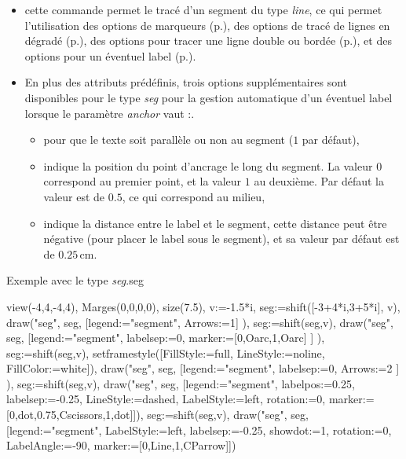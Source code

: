 {\centering {}\par}

\begin{itemize}
 \item\desc cette commande permet le tracé d'un segment du type \emph{line}, ce qui permet l'utilisation des options de marqueurs (p.\pageref{marqueurs}), des options de tracé de lignes en dégradé (p.\pageref{gradLines}), des options pour tracer une ligne double ou bordée (p.\pageref{optionsline}), et des options pour un éventuel label (p.\pageref{optionslabels}). 
 \item En plus des attributs prédéfinis, trois options supplémentaires sont disponibles pour le type \emph{seg} pour la gestion automatique d'un éventuel label lorsque le paramètre \emph{anchor} vaut :\label{seg}.
  \begin{itemize}
   \item {} pour que le texte soit parallèle ou non au segment ($1$ par défaut),
   \item {} indique la position du point d'ancrage le long du segment. La valeur $0$ correspond au premier point, et la valeur $1$ au deuxième. Par défaut la valeur est de $0.5$, ce qui correspond au milieu,
   \item {} indique la distance entre le label et le segment, cette distance peut être négative (pour placer le label sous le segment), et sa valeur par défaut est de $0.25$\,cm.
  \end{itemize}
\end{itemize}

\begin{demo}{Exemple avec le type \emph{seg}.}{seg}
\begin{texgraph}[name=seg]
view(-4,4,-4,4), Marges(0,0,0,0), size(7.5),
v:=-1.5*i, seg:=shift([-3+4*i,3+5*i], v),
draw("seg", seg, [legend:="segment", Arrows:=1] ),
seg:=shift(seg,v),
draw("seg", seg, [legend:="segment", labelsep:=0, 
   marker:=[0,Oarc,1,Oarc] ] ),
seg:=shift(seg,v), 
setframestyle([FillStyle:=full, LineStyle:=noline, 
   FillColor:=white]),
draw("seg", seg, [legend:="segment", labelsep:=0, 
 Arrows:=2 ] ),
seg:=shift(seg,v),
draw("seg", seg, [legend:="segment", labelpos:=0.25, 
 labelsep:=-0.25, LineStyle:=dashed, LabelStyle:=left,
 rotation:=0, marker:=[0,dot,0.75,Cscissors,1,dot]]),
seg:=shift(seg,v),
draw("seg", seg, [legend:="segment", LabelStyle:=left,
 labelsep:=-0.25, showdot:=1, rotation:=0, 
 LabelAngle:=-90, marker:=[0,Line,1,CParrow]]) 
\end{texgraph}
\end{demo}

